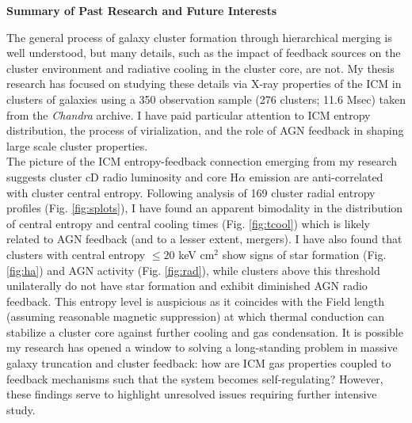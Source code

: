 \documentclass[11pt]{article}
\begin{document}
\begin{center}
\textbf{Summary of Past Research and Future Interests}
\end{center}

The general process of galaxy cluster formation through hierarchical
merging is well understood, but many details, such as the impact of
feedback sources on the cluster environment and radiative cooling in
the cluster core, are not. My thesis research has focused on studying
these details via X-ray properties of the ICM in clusters of galaxies
using a 350 observation sample (276 clusters; 11.6 Msec) taken from
the {\it Chandra} archive. I have paid particular attention to ICM
entropy distribution, the process of virialization, and the role of
AGN feedback in shaping large scale cluster properties.\\

The picture of the ICM entropy-feedback connection emerging from my
research suggests cluster cD radio luminosity and core H$\alpha$
emission are anti-correlated with cluster central entropy. Following
analysis of 169 cluster radial entropy profiles
(Fig. \ref{fig:splots}), I have found an apparent bimodality in the
distribution of central entropy and central cooling times
(Fig. \ref{fig:tcool}) which is likely related to AGN feedback (and to
a lesser extent, mergers). I have also found that clusters with
central entropy $\leq 20$ keV cm$^2$ show signs of star formation
(Fig. \ref{fig:ha}) and AGN activity (Fig. \ref{fig:rad}), while
clusters above this threshold unilaterally do not have star formation
and exhibit diminished AGN radio feedback. This entropy level is
auspicious as it coincides with the Field length (assuming reasonable
magnetic suppression) at which thermal conduction can stabilize a
cluster core against further cooling and gas condensation. It is
possible my research has opened a window to solving a long-standing
problem in massive galaxy truncation and cluster feedback: how are ICM
gas properties coupled to feedback mechanisms such that the system
becomes self-regulating? However, these findings serve to highlight
unresolved issues requiring further intensive study.\\
\end{document}
